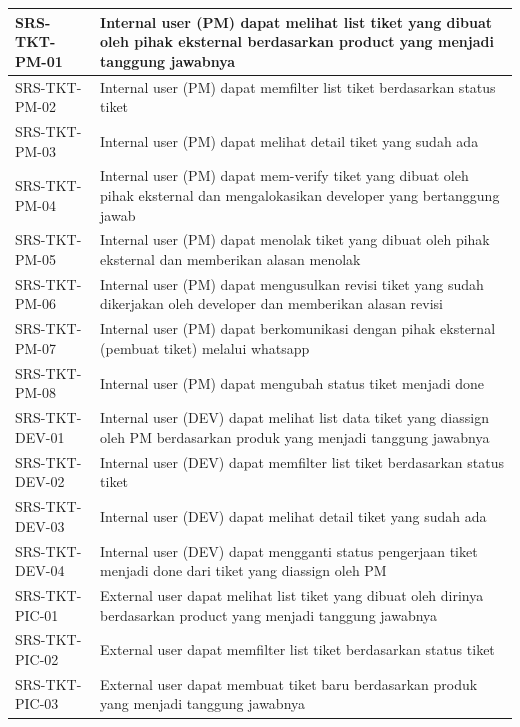 \documentclass[12pt]{article}
\begin{document}
\begin{enumerate}[label=\textbf{4.\arabic*.}]
\begin{enumerate}[label=\textbf{4.1.\arabic*.}]
\begin{longtable}{|l|p{}|}
            SRS-TKT-PM-01 & Internal user (PM) dapat melihat list tiket yang dibuat oleh pihak eksternal berdasarkan product yang menjadi tanggung jawabnya \\
            \hline
            SRS-TKT-PM-02 & Internal user (PM) dapat memfilter list tiket berdasarkan status tiket \\
            \hline
            SRS-TKT-PM-03 & Internal user (PM) dapat melihat detail tiket yang sudah ada \\
            \hline
            SRS-TKT-PM-04 & Internal user (PM) dapat mem-verify tiket yang dibuat oleh pihak eksternal dan mengalokasikan developer yang bertanggung jawab \\
            \hline
            SRS-TKT-PM-05 & Internal user (PM) dapat menolak tiket yang dibuat oleh pihak eksternal dan memberikan alasan menolak \\
            \hline
            SRS-TKT-PM-06 & Internal user (PM) dapat mengusulkan revisi tiket yang sudah dikerjakan oleh developer dan memberikan alasan revisi \\
            \hline
            SRS-TKT-PM-07 & Internal user (PM) dapat berkomunikasi dengan pihak eksternal (pembuat tiket) melalui whatsapp \\
            \hline
            SRS-TKT-PM-08 & Internal user (PM) dapat mengubah status tiket menjadi done \\
            \hline
            SRS-TKT-DEV-01 & Internal user (DEV) dapat melihat list data tiket yang diassign oleh PM berdasarkan produk yang menjadi tanggung jawabnya \\
            \hline
            SRS-TKT-DEV-02 & Internal user (DEV) dapat memfilter list tiket berdasarkan status tiket \\
            \hline
            SRS-TKT-DEV-03 & Internal user (DEV) dapat melihat detail tiket yang sudah ada \\
            \hline
            SRS-TKT-DEV-04 & Internal user (DEV) dapat mengganti status pengerjaan tiket menjadi done dari tiket yang diassign oleh PM \\
            \hline
            SRS-TKT-PIC-01 & External user dapat melihat list tiket yang dibuat oleh dirinya berdasarkan product yang menjadi tanggung jawabnya \\
            \hline
            SRS-TKT-PIC-02 & External user dapat memfilter list tiket berdasarkan status tiket \\
            \hline
            SRS-TKT-PIC-03 & External user dapat membuat tiket baru berdasarkan produk yang menjadi tanggung jawabnya \\

\end{longtable}
\end{enumerate}
\end{enumerate}
\end{document}
